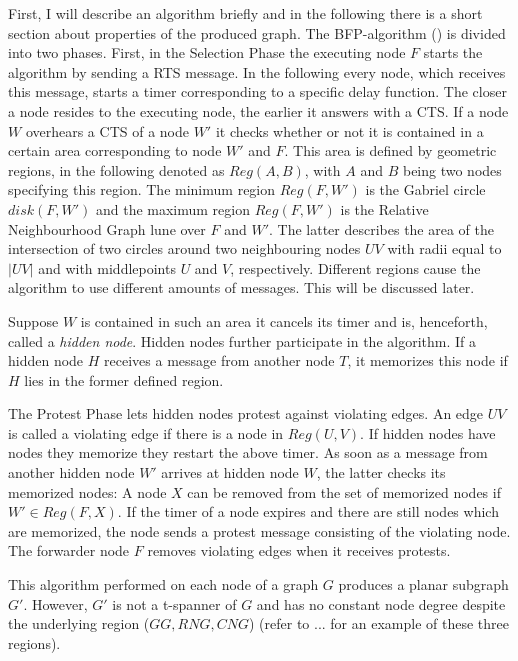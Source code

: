 First, I will describe an algorithm briefly and in the following there is a short section about properties of the produced graph.
The BFP-algorithm (\cite{Ruhrup2010}) is divided into two phases.
First, in the Selection Phase the executing node $F $ starts the algorithm by sending a RTS message. 
In the following every node, which receives this message, starts a timer corresponding to a specific delay function.
The closer a node resides to the executing node, the earlier it answers with a CTS. 
If a node $W $ overhears a CTS of a node $W' $ it checks whether or not it is contained in a certain area corresponding to node $W' $ and $F $.
This area is defined by geometric regions, in the following denoted as $Reg(A, B) $, with $A $ and $B $ being two nodes specifying this region.
The minimum region $Reg(F, W') $ is the Gabriel circle $disk(F, W') $ and the maximum region $Reg(F, W') $ is the Relative Neighbourhood Graph lune over $F $ and $W' $.
The latter describes the area of the intersection of two circles around two neighbouring nodes $UV $ with radii equal to $|UV| $ and with middlepoints $U $ and $V $, respectively.
Different regions cause the algorithm to use different amounts of messages.
This will be discussed later.

Suppose $W $ is contained in such an area it cancels its timer and is, henceforth, called a \emph{hidden node}.
Hidden nodes further participate in the algorithm.
If a hidden node $H $ receives a message from another node $T $, it memorizes this node if $H $ lies in the former defined region. 

The Protest Phase lets hidden nodes protest against violating edges.
An edge $UV $ is called a violating edge if there is a node in $Reg(U, V) $.
If hidden nodes have nodes they memorize they restart the above timer.
As soon as a message from another hidden node $W' $ arrives at hidden node $W $, the latter checks its memorized nodes:
A node $X $ can be removed from the set of memorized nodes if $W' \in Reg(F,X) $.
If the timer of a node expires and there are still nodes which are memorized, the node sends a protest message consisting of the violating node.
The forwarder node $F $ removes violating edges when it receives protests.

This algorithm performed on each node of a graph $G $ produces a planar subgraph $G' $.
However, $G' $ is not a t-spanner of $G $ and has no constant node degree despite the underlying region ($GG, RNG, CNG $) (refer to ... for an example of these three regions).

